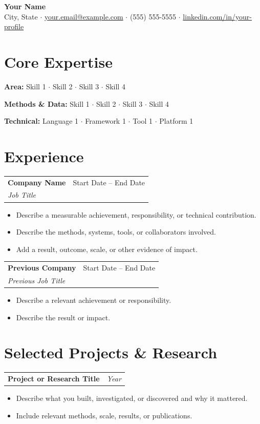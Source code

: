 \documentclass[10pt,letterpaper]{article}
\makeatletter
\newcommand{\heading}[2]{\vspace{2pt}\begin{tabularx}{\textwidth}{@{}Xr@{}}\textbf{#1} & \textit{#2}\end{tabularx}\vspace{-0pt}}
\newcommand{\headingwtitle}[3]{\vspace{2pt}\begin{tabularx}{\textwidth}{@{}Xr@{}}\textbf{#1} & #3\\[1pt] \textit{#2} & \end{tabularx}\vspace{-0pt}}
\makeatother
\begin{document}
\begin{center}
{\LARGE \textbf{Your Name}}\\[3pt]
City, State \quad $\cdot$ \quad
\href{mailto:your.email@example.com}{your.email@example.com} \quad $\cdot$ \quad
(555) 555-5555 \quad $\cdot$ \quad
\href{https://www.linkedin.com/in/your-profile/}{linkedin.com/in/your-profile}
\end{center}
\vspace{-3pt}

\section*{Core Expertise}
\textbf{Area:} Skill 1 $\cdot$ Skill 2 $\cdot$ Skill 3 $\cdot$ Skill 4

\textbf{Methods \& Data:} Skill 1 $\cdot$ Skill 2 $\cdot$ Skill 3 $\cdot$ Skill 4

\textbf{Technical:} Language 1 $\cdot$ Framework 1 $\cdot$ Tool 1 $\cdot$ Platform 1

\section*{Experience}
\headingwtitle{Company Name}{Job Title}{Start Date -- End Date}
\begin{itemize}
\item Describe a measurable achievement, responsibility, or technical contribution.
\item Describe the methods, systems, tools, or collaborators involved.
\item Add a result, outcome, scale, or other evidence of impact.
\end{itemize}

\headingwtitle{Previous Company}{Previous Job Title}{Start Date -- End Date}
\begin{itemize}
\item Describe a relevant achievement or responsibility.
\item Describe the result or impact.
\end{itemize}

\section*{Selected Projects \& Research}
\heading{Project or Research Title}{Year}
\begin{itemize}
\item Describe what you built, investigated, or discovered and why it mattered.
\item Include relevant methods, scale, results, or publications.
\end{itemize}
\end{document}
